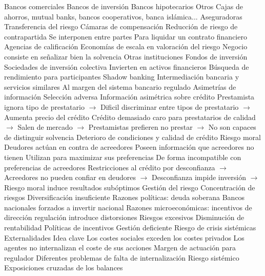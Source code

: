 \documentclass{nuevotema}
\begin{document}
\begin{esquemal}
				\4 Bancos comerciales
				\4 Bancos de inversión
				\4 Bancos hipotecarios
				\4 Otros
				\4[] Cajas de ahorros, mutual banks, bancos cooperativos, banca islámica...
			\3 Aseguradoras
				\4 Transferencia del riesgo
			\3 Cámaras de compensación
				\4 Reducción de riesgo de contrapartida
				\4 Se interponen entre partes
				\4[] Para liquidar un contrato financiero
			\3 Agencias de calificación
				\4 Economías de escala en valoración del riesgo
				\4 Negocio consiste en señalizar bien la solvencia
			\3 Otras instituciones
				\4 Fondos de inversión
				\4[] Sociedades de inversión colectiva
				\4[] Invierten en activos financieros
				\4[] Búsqueda de rendimiento para participantes
				\4 Shadow banking
				\4[] Intermediación bancaria y servicios similares
				\4[] Al margen del sistema bancario regulado
	\1 
		\2 Asimetrías de información
			\3 Selección adversa
				\4 Información asimétrica sobre crédito
				\4[] Prestamista ignora tipo de prestatario
				\4[] $\to$ Dificil discriminar entre tipos de prestatario
				\4[] $\to$ Aumenta precio del crédito
				\4[] Crédito demasiado caro para prestatarios de calidad
				\4[] $\to$ Salen de mercado
				\4[] $\to$ Prestamistas prefieren no prestar
				\4[] $\to$ No son capaces de distinguir solvencia
				\4[$\then$] Deterioro de condiciones y calidad de crédito
			\3 Riesgo moral
				\4 Deudores actúan en contra de acreedores
				\4[] Poseen información que acreedores no tienen
				\4[] Utilizan para maximizar sus preferencias
				\4[] De forma incompatible con preferencias de acreedores
				\4[$\then$] Restricciones al crédito por desconfianza
				\4[] $\to$ Acreedores no pueden confiar en deudores
				\4[] $\to$ Desconfianza impide inversión
				\4[] $\to$ Riesgo moral induce resultados subóptimos
		\2 Gestión del riesgo
			\3 Concentración de riesgos
				\4 Diversificación insuficiente
				\4 Razones políticas:
				\4[] deuda soberana
				\4[] Bancos nacionales forzados a invertir nacional
				\4 Razones microeconómicas:
				\4[] incentivos de dirección
				\4[] regulación introduce distorsiones
			\3 Riesgos excesivos
				\4 Disminución de rentabilidad
				\4 Políticas de incentivos
				\4 Gestión deficiente
				\4 Riesgo de crisis sistémicas
		\2 Externalidades
			\3 Idea clave
				\4 Los costes sociales exceden los costes privados
				\4[] Los agentes no internalizan el coste de sus acciones
				\4[$\Rightarrow$] Margen de actuación para regulador
				\4 Diferentes problemas de falta de internalización
			\3 Riesgo sistémico
				\4 Exposiciones cruzadas de los balances

\end{esquemal}
\end{document}

